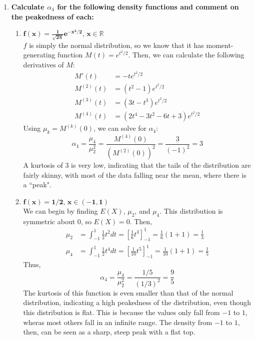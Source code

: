 \documentclass{article}
\newcommand{\R}{\mathbb{R}}
\begin{document}
\begin{enumerate}
	\item \textbf{Calculate $\alpha_4$ for the following density functions and comment on the peakedness of each:}
		\begin{enumerate}
			\item $\mathbf{f(x)=\frac{1}{\sqrt{2\pi}}e^{-x^2/2}\text{, }x\in\R}$
				\bigskip \\
				$f$ is simply the normal distribution, so we know that it has moment-generating function $M(t)=e^{t^2/2}$. Then, we can calculate the following derivatives of $M$:
				\begin{align*}
					M'(t) 		&= -te^{t^2/2}					\\
					M^{(2)}(t)	&= (t^2 - 1)e^{t^2/2}			\\
					M^{(3)}(t)	&= (3t-t^3)e^{t^2/2} 			\\
					M^{(4)}(t)	&= (2t^4-3t^2-6t+3)e^{t^2/2}
				\end{align*}
				Using $\mu_k=M^{(k)}(0)$, we can solve for $\alpha_4$:
				\[
					\alpha_4 = \dfrac{\mu_4}{\mu_2^2} = \dfrac{M^{(4)}(0)}{(M^{(2)}(0))^2} = \dfrac{3}{(-1)^2} = 3
				\]
				A kurtosis of 3 is very low, indicating that the tails of the distribution are fairly skinny, with most of the data falling near the mean, where there is a ``peak". 
			
			\item $\mathbf{f(x)=1/2\text{, }x\in(-1,1)}$
				\bigskip \\
				We can begin by finding $E(X)$, $\mu_2$, and $\mu_4$. This distribution is symmetric about $0$, so $E(X)=0$. Then,
				\begin{align*}
					\mu_2 &= \int^1_{-1} \frac{1}{2}t^2dt = [\frac{1}{6}t^3]^1_{-1} = \frac{1}{6}(1+1) = \frac{1}{3}	\\
					\mu_4 &= \int^1_{-1} \frac{1}{2}t^4dt = [\frac{1}{10}t^5]^1_{-1} = \frac{1}{10}(1+1) = \frac{1}{5}
				\end{align*}
				Thus,
				\[
					\alpha_4 = \dfrac{\mu_4}{\mu_2^2} = \dfrac{1/5}{(1/3)^2} = \dfrac{9}{5}
				\]
				The kurtosis of this function is even smaller than that of the normal distribution, indicating a high peakedness of the distribution, even though this distribution is flat. This is because the values only fall from $-1$ to $1$, wheras most others fall in an infinite range. The density from $-1$ to $1$, then, can be seen as a sharp, steep peak with a flat top.
				

\end{enumerate}
\end{enumerate}
\end{document}
